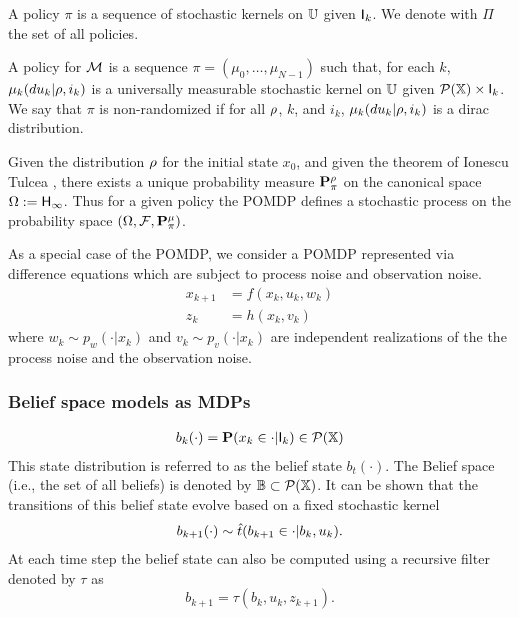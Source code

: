 \documentclass{ifacconf}
\newcommand{\red}[1]{{\color{red} #1}}
\begin{document}
 A policy $\pi$ is a sequence of stochastic kernels on $\U$ given $\I_k$. 
We denote with $\Pi$ the set of all policies.
\citep[Def. 10.4]{bertsekas2004stochastic}  

\begin{definition}
	A policy for $\MDP$ is a sequence $\pi=(\mu_0,\ldots,\mu_{N-1})$ such that, for each $k$, $\mu_k(du_k|\init, i_k)$ is a universally measurable stochastic kernel on $\U$  given $\mathcal{P}(\X)\times \I_k$.
	We say that $\pi$ is non-randomized if for all $\init$, $k$, and $i_k$,    $\mu_k(du_k|\init, i_k)$ is a dirac distribution.
\end{definition}
 Given the distribution $\init$ for the initial state $x_0$,  and given the theorem of Ionescu Tulcea \citep{hll1996}, there exists a unique probability measure $\P_\pi^\init$ on the canonical space $\Omega:=\Hist_\infty$. Thus for a given policy the POMDP defines a stochastic process on the probability space  
 $(\Omega,\mathcal F,\P_\pi^\mu)$.
\begin{example}[\red{[to be deleted for submission]}]
	As a special case of the POMDP, we consider a POMDP represented via difference equations which are subject to process noise and observation noise.
\begin{align*}
x_{k+1}&=f(x_k,u_k,w_k)\\
z_k&=h(x_k,v_k)
\end{align*}
where $w_k\sim p_w(\cdot|x_k)$ and $v_k\sim p_v(\cdot|x_k)$ are independent realizations of the the process noise and the observation noise.


\end{example}

 \subsubsection{Belief space models as MDPs}
\begin{align}
	b_k(\cdot)=\P(x_k\in \cdot|\I_k)\in \mathcal P (\X)
\end{align}
This state distribution is referred to as the belief state $b_t(\cdot)$. 
The Belief space (i.e., the set of all beliefs) is denoted by $\mathbb{B}\subset \mathcal P(\X)$.
It can be shown that the transitions of this belief state evolve based on a fixed stochastic kernel
\begin{align}
	 b_{k+1}(\cdot)\sim \trb(b_{k+1}\in \cdot|b_k,u_k).
\end{align}
At each time step the belief state can also be computed using a 
recursive filter denoted by $\tau$ as 
\[b_{k+1}=\tau(b_k,u_k,z_{k+1}).\]
\end{document}
